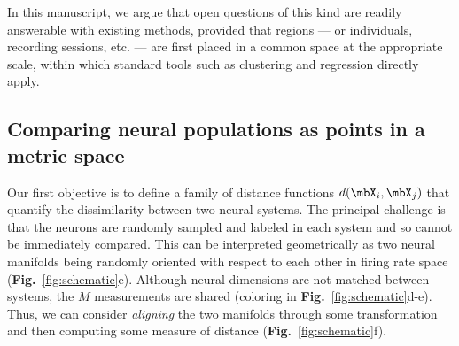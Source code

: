 In this manuscript, we argue that open questions of this kind are readily answerable with existing methods, provided that regions --- or individuals, recording sessions, etc. --- are first placed in a common space at the appropriate scale, within which standard tools such as clustering and regression directly apply. 

\subsection{Comparing neural populations as points in a metric space}



Our first objective is to define a family of distance functions $d(\mbX_i, \mbX_j)$ that quantify the dissimilarity between two neural systems.
The principal challenge is that the neurons are randomly sampled and labeled in each system and so cannot be immediately compared.
This can be interpreted geometrically as two neural manifolds being randomly oriented with respect to each other in firing rate space (\textbf{Fig.}~\ref{fig:schematic}e).
Although neural dimensions are not matched between systems, the $M$ measurements are shared (coloring in \textbf{Fig.}~\ref{fig:schematic}d-e).
Thus, we can consider \textit{aligning} the two manifolds through some transformation and then computing some measure of distance (\textbf{Fig.}~\ref{fig:schematic}f). 

